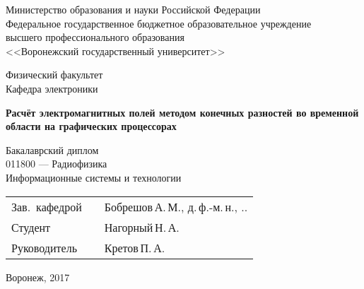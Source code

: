 %
%

\begin{titlepage}
\centering
Министерство образования и науки Российской Федерации\\
Федеральное государственное бюджетное образовательное учреждение\\
высшего профессионального образования\\
<<Воронежский государственный университет>>\\

\vspace{20mm}

Физический факультет\\
Кафедра электроники

\vspace{35mm}

\textbf{
    Расчёт электромагнитных полей методом конечных разностей во временной области на графических процессорах}

\vspace{15mm}
Бакалаврский диплом\\
\vspace{10mm}
011800 --- Радиофизика\\
Информационные системы и технологии\\

\vspace{20mm}
\begin{tabularx}{\textwidth}{lll}
Зав.~кафедрой & \hspace{35mm} & Бобрешов\,А.\,М., д.\,ф.-м.\,н.,
\underline{\hspace{5mm}}.\underline{\hspace{5mm}}.\underline{\hspace{10mm}}\\
Студент       & \hspace{35mm} & Нагорный\,Н.\,А.\\
Руководитель  & \hspace{35mm} &  Кретов\,П.\,А.\\
\end{tabularx}

\vspace*{\fill}

Воронеж, 2017
\end{titlepage}
\setcounter{page}{2}